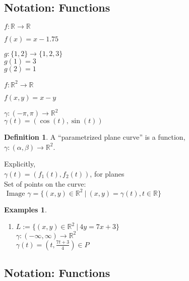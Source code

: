 \documentclass[twocolumn,20pt,fleqn]{extarticle}
\newcommand{\sep}{\vspace{0.5cm}}
\theoremstyle{plain}
\theoremstyle{definition}
\newtheorem*{definition}{Definition}
\newtheorem*{exmpls}{Examples}
\theoremstyle{remark}
\newenvironment*{examples}{\begin{exmpls} ~ \begin{enumerate}}{\end{enumerate}\end{exmpls}}
\begin{document}
\clearpage




\subsection{Notation: Functions}

$ f: \mathbb{R}  \to \mathbb{R}$

$f(x) = x - 1.75$\\

\sep

  $g : \{1,2\} \to \{1,2,3\}$\\
    $g(1) = 3$\\
    $g(2) = 1$\\

\sep

$ f: \mathbb{R}^2  \to \mathbb{R}$

$f(  x,y  ) = x - y$


\sep

$\gamma :  (-\pi,\pi)  \to \mathbb{R}^2$\\
$\gamma(t) = (\cos(t), \sin(t))$



\newpage



\begin{definition}
  A  ``parametrized plane curve''  is a  function,\\ $\gamma  : (\alpha, \beta) \to \mathbb{R}^2$.
\end{definition}

Explicitly,\\
$\gamma(t) = (f_1(t), f_2(t))$, for planes\\

Set of points on the curve:\\  $\textrm{ Image } \gamma = \{(x,y) \in \mathbb{R}^2 \ |\ (x,y) = \gamma(t), t \in \mathbb{R}\}$




\begin{examples}
  \item $L:=\{(x,y) \in \mathbb{R}^2\ |\ 4y = 7x + 3\}$\\
  $\gamma  : (-\infty,\infty) \to \mathbb{R}^2$ \\
  $\gamma(t) = (t, \frac{7t+3}{4})  \in P$\\\end{examples}


\clearpage




\subsection{Notation: Functions}
\end{document}
